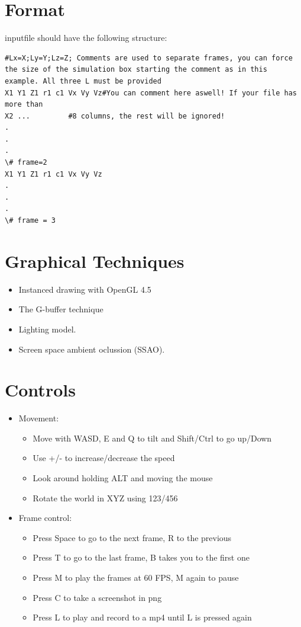 \documentclass[ twoside,openright,titlepage,numbers=noenddot,%
headinclude,footinclude,cleardoublepage=empty,abstract=on,
BCOR=5mm,paper=a4,fontsize=11pt, dvipsnames
]{scrreprt}
\def\ucpp{uammd_cpp_lexer.py:UAMMDCppLexer -x}
\begin{document}
\section{Format}
inputfile should have the following structure:
\begin{verbatim}
#Lx=X;Ly=Y;Lz=Z; Comments are used to separate frames, you can force the size of the simulation box starting the comment as in this example. All three L must be provided
X1 Y1 Z1 r1 c1 Vx Vy Vz#You can comment here aswell! If your file has more than
X2 ...         #8 columns, the rest will be ignored!
.
.
.
\# frame=2
X1 Y1 Z1 r1 c1 Vx Vy Vz
.
.
.
\# frame = 3
\end{verbatim}

\section{Graphical Techniques}

\begin{itemize}
\item Instanced drawing with OpenGL 4.5
\item The G-buffer technique
\item Lighting model.
\item Screen space ambient oclussion (SSAO).
\end{itemize}

\section{Controls}

\begin{itemize}
\item  Movement:
  \begin{itemize}
  \item Move with WASD, E and Q to tilt and Shift/Ctrl to go up/Down
  \item Use +/- to increase/decrease the speed
  \item Look around holding ALT and moving the mouse
  \item Rotate the world in XYZ using 123/456    
  \end{itemize}
\item Frame control:
  \begin{itemize}
  \item Press Space to go to the next frame, R to the previous
  \item Press T to go to the last frame, B takes you to the first one
  \item Press M to play the frames at 60 FPS, M again to pause
  \item Press C to take a screenshot in png
  \item Press L to play and record to a mp4 until L is pressed again
  \end{itemize}
\end{itemize}
\end{document}
